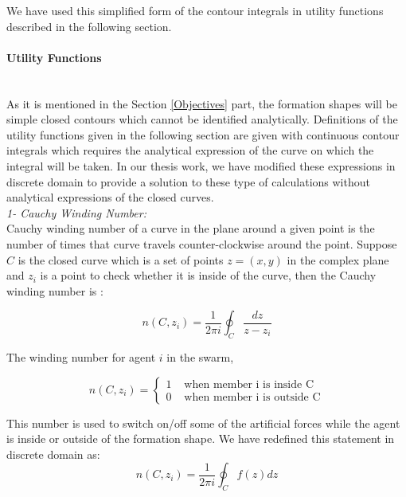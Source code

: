 We have used this simplified form of the contour integrals in utility functions described in the following section. 		
		
\paragraph{Utility Functions}\hspace{0pt} \\
As it is mentioned in the Section \ref{Objectives} part, the formation shapes will be simple closed contours which cannot be identified analytically. Definitions of the utility functions given in the following section are given with continuous contour integrals which requires the analytical expression of the curve on which the integral will be taken. In our thesis work, we have modified these expressions in discrete domain to provide a solution to  these type of calculations without analytical expressions of the closed curves.\\

\textit{ 		1- Cauchy Winding Number:} \\ 
Cauchy winding number of a curve in the plane around a given point is the number of times that curve travels counter-clockwise around the point. Suppose $C$ is the closed curve which is a set of points $z=(x,y)$ in the complex plane  and $z_i$ is a point to check whether it is inside of the curve, then the Cauchy winding number is \cite{17} :
					
\begin{equation}
 n(C,z_i) = \frac{1}{2\pi i}\oint_C \frac{dz}{z-z_i}
\end{equation}
		
The winding number for agent $i$ in the swarm,

\begin{equation}
n(C,z_i) = \left\{ \begin{array}{rl}
1 &\mbox{ when member i is inside C} \\
0 &\mbox{ when member i is outside C}
\end{array} \right.
\end{equation}

This number is used to switch on/off some of the artificial forces while the agent is inside or outside of the formation shape. We have redefined this statement in discrete domain as:
\begin{equation}
n(C,z_i) = \frac{1}{2\pi i} \oint_C f(z)dz
\end{equation}

